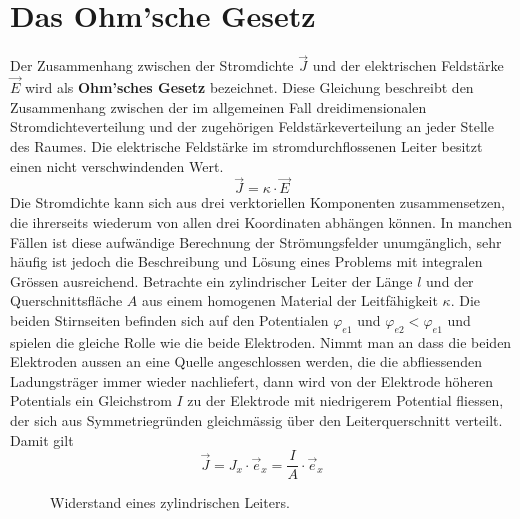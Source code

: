 \section{Das Ohm'sche Gesetz}
Der Zusammenhang zwischen der Stromdichte $\overrightarrow{J}$ und der elektrischen Feldstärke $\overrightarrow{E}$ wird als \textbf{Ohm'sches Gesetz }bezeichnet. Diese Gleichung beschreibt den Zusammenhang zwischen der im allgemeinen Fall dreidimensionalen Stromdichteverteilung und der zugehörigen Feldstärkeverteilung an jeder Stelle des Raumes. Die elektrische Feldstärke im stromdurchflossenen Leiter besitzt einen nicht verschwindenden Wert.
\begin{equation}
\boxed{\overrightarrow{J}=\kappa\cdot \overrightarrow{E}}
\end{equation}
Die Stromdichte kann sich aus drei verktoriellen Komponenten zusammensetzen, die ihrerseits wiederum von allen drei Koordinaten abhängen können. In manchen Fällen ist diese aufwändige Berechnung der Strömungsfelder unumgänglich, sehr häufig ist jedoch die Beschreibung und Lösung eines Problems mit integralen Grössen ausreichend.
\newline\newline
Betrachte ein zylindrischer Leiter der Länge $l$ und der Querschnittsfläche $A$ aus einem homogenen Material der Leitfähigkeit $\kappa$. Die beiden Stirnseiten befinden sich auf den Potentialen $\varphi_{e1}$ und $\varphi_{e2}<\varphi_{e1}$ und spielen die gleiche Rolle wie die beide Elektroden. Nimmt man an dass die beiden Elektroden aussen an eine Quelle angeschlossen werden, die die abfliessenden Ladungsträger immer wieder nachliefert, dann wird von der Elektrode höheren Potentials ein Gleichstrom $I$ zu der Elektrode mit niedrigerem Potential fliessen, der sich aus Symmetriegründen gleichmässig über den Leiterquerschnitt verteilt. Damit gilt
\begin{equation}
\boxed{\overrightarrow{J}=J_x\cdot \overrightarrow{e}_x=\dfrac{I}{A}\cdot \overrightarrow{e}_x}
\end{equation}
\begin{figure}[H]
\centering
\caption{Widerstand eines zylindrischen Leiters.}
\label{fig_IIe}
\end{figure}
